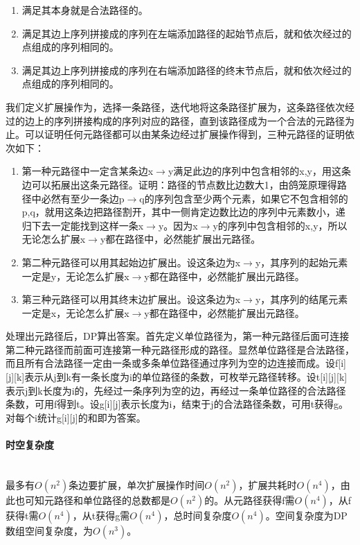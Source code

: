 \documentclass[UTF8]{ctexart}
\newcommand{\myparagraph}[1]{\paragraph{#1}\mbox{}\\}
\theoremstyle{nonumberplain}
\begin{document}
			\begin{enumerate}
				\item 满足其本身就是合法路径的。
				\item 满足其边上序列拼接成的序列在左端添加路径的起始节点后，就和依次经过的点组成的序列相同的。
				\item 满足其边上序列拼接成的序列在右端添加路径的终末节点后，就和依次经过的点组成的序列相同的。
			\end{enumerate}
			
			我们定义扩展操作为，选择一条路径，迭代地将这条路径扩展为，这条路径依次经过的边上的序列拼接构成的序列对应的路径，直到该路径成为一个合法的元路径为止。可以证明任何元路径都可以由某条边经过扩展操作得到，三种元路径的证明依次如下：
			
			\begin{enumerate}
				\item 第一种元路径中一定含某条边x$\rightarrow$y满足此边的序列中包含相邻的x,y，用这条边可以拓展出这条元路径。证明：路径的节点数比边数大1，由鸽笼原理得路径中必然有至少一条边p$\rightarrow$q的序列包含至少两个元素，如果它不包含相邻的p,q，就用这条边把路径割开，其中一侧肯定边数比边的序列中元素数小，递归下去一定能找到这样一条x$\rightarrow$y。因为x$\rightarrow$y的序列中包含相邻的x,y，所以无论怎么扩展x$\rightarrow$y都在路径中，必然能扩展出元路径。
				\item 第二种元路径可以用其起始边扩展出。设这条边为x$\rightarrow$y，其序列的起始元素一定是y，无论怎么扩展x$\rightarrow$y都在路径中，必然能扩展出元路径。
				\item 第三种元路径可以用其终末边扩展出。设这条边为x$\rightarrow$y，其序列的结尾元素一定是x，无论怎么扩展x$\rightarrow$y都在路径中，必然能扩展出元路径。
			\end{enumerate}
			
			处理出元路径后，DP算出答案。首先定义单位路径为，第一种元路径后面可连接第二种元路径而前面可连接第一种元路径形成的路径。显然单位路径是合法路径，而且所有合法路径一定由一条或多条单位路径通过序列为空的边连接而成。设f[i][j][k]表示从j到k有一条长度为i的单位路径的条数，可枚举元路径转移。设t[i][j][k]表示j到k长度为i的，先经过一条序列为空的边，再经过一条单位路径的合法路径条数，可用f得到t。设g[i][j]表示长度为i，结束于j的合法路径条数，可用t获得g。对每个i统计g[i][j]的和即为答案。
		
		\myparagraph{时空复杂度}
		
			最多有$O(n^2)$条边要扩展，单次扩展操作时间$O(n^2)$，扩展共耗时$O(n^4)$，由此也可知元路径和单位路径的总数都是$O(n^2)$的。从元路径获得f需$O(n^4)$，从f获得t需$O(n^4)$，从t获得g需$O(n^4)$，总时间复杂度$O(n^4)$。空间复杂度为DP数组空间复杂度，为$O(n^3)$。
	
\end{document}
